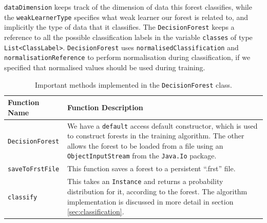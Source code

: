 \documentclass[12pt,twoside,notitlepage]{report}
\begin{document}
                \texttt{dataDimension} keeps track of the dimension of data this forest classifies, while the 
                \texttt{weakLearnerType} specifies what weak learner our forest is related to, and implicitly the type 
                of data that it classifies. The \texttt{DecisionForest} keeps a reference to all the possible classification labels in 
                the variable \texttt{classes} of type \texttt{List<ClassLabel>}. \texttt{DecisionForest} uses 
                \texttt{normalisedClassification} and \texttt{normalisationReference} to 
                perform normalisation during classification, if we specified that normalised values should be used during 
                training.

                \begin{table}[H]
                    \begin{tabularx}{\textwidth}{l|X}
                        \textbf{Function Name} & \textbf{Function Description} \\
                        \hline

                        \texttt{DecisionForest} & 
                            We have a \texttt{default} access 
                            default constructor, which is used to construct forests in the training algorithm. The 
                            other allows the forest to be loaded from a file using an \texttt{ObjectInputStream} from 
                            the \texttt{Java.Io} package. \\ 
                        \hline

                        \texttt{saveToFrstFile} & 
                            This function saves a forest to a persistent ``.frst'' file. \\ 
                        \hline

                        \texttt{classify} & 
                            This takes an \texttt{Instance} and returns a probability distribution for it, according 
                            to the forest. The algorithm implementation is discussed in more detail in section 
                            \ref{sec:classification}. \\ 

                    \end{tabularx}
                    \caption{Important methods implemented in the \texttt{DecisionForest} class.}
                    \label{tab:DecisionForest}
                \end{table}
\end{document}
